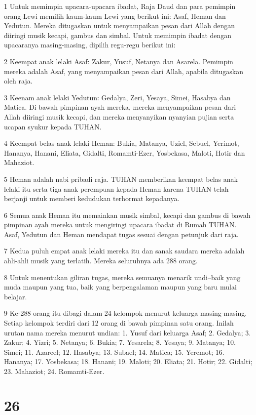 \par 1 Untuk memimpin upacara-upacara ibadat, Raja Daud dan para pemimpin orang Lewi memilih kaum-kaum Lewi yang berikut ini: Asaf, Heman dan Yedutun. Mereka ditugaskan untuk menyampaikan pesan dari Allah dengan diiringi musik kecapi, gambus dan simbal. Untuk memimpin ibadat dengan upacaranya masing-masing, dipilih regu-regu berikut ini:
\par 2 Keempat anak lelaki Asaf: Zakur, Yusuf, Netanya dan Asarela. Pemimpin mereka adalah Asaf, yang menyampaikan pesan dari Allah, apabila ditugaskan oleh raja.
\par 3 Keenam anak lelaki Yedutun: Gedalya, Zeri, Yesaya, Simei, Hasabya dan Matica. Di bawah pimpinan ayah mereka, mereka menyampaikan pesan dari Allah diiringi musik kecapi, dan mereka menyanyikan nyanyian pujian serta ucapan syukur kepada TUHAN.
\par 4 Keempat belas anak lelaki Heman: Bukia, Matanya, Uziel, Sebuel, Yerimot, Hananya, Hanani, Eliata, Gidalti, Romamti-Ezer, Yosbekasa, Maloti, Hotir dan Mahaziot.
\par 5 Heman adalah nabi pribadi raja. TUHAN memberikan keempat belas anak lelaki itu serta tiga anak perempuan kepada Heman karena TUHAN telah berjanji untuk memberi kedudukan terhormat kepadanya.
\par 6 Semua anak Heman itu memainkan musik simbal, kecapi dan gambus di bawah pimpinan ayah mereka untuk mengiringi upacara ibadat di Rumah TUHAN. Asaf, Yedutun dan Heman mendapat tugas sesuai dengan petunjuk dari raja.
\par 7 Kedua puluh empat anak lelaki mereka itu dan sanak saudara mereka adalah ahli-ahli musik yang terlatih. Mereka seluruhnya ada 288 orang.
\par 8 Untuk menentukan giliran tugas, mereka semuanya menarik undi--baik yang muda maupun yang tua, baik yang berpengalaman maupun yang baru mulai belajar.
\par 9 Ke-288 orang itu dibagi dalam 24 kelompok menurut keluarga masing-masing. Setiap kelompok terdiri dari 12 orang di bawah pimpinan satu orang. Inilah urutan nama mereka menurut undian: 1. Yusuf dari keluarga Asaf; 2. Gedalya; 3. Zakur; 4. Yizri; 5. Netanya; 6. Bukia; 7. Yesarela; 8. Yesaya; 9. Matanya; 10. Simei; 11. Azareel; 12. Hasabya; 13. Subael; 14. Matica; 15. Yeremot; 16. Hananya; 17. Yosbekasa; 18. Hanani; 19. Maloti; 20. Eliata; 21. Hotir; 22. Gidalti; 23. Mahaziot; 24. Romamti-Ezer.

\chapter{26}


